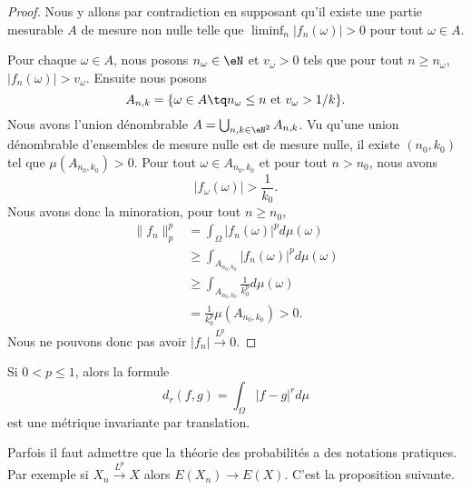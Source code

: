 \begin{proof}
	Nous y allons par contradiction en supposant qu'il existe une partie mesurable \( A\) de mesure non nulle telle que \( \liminf_n| f_n(\omega) |>0\) pour tout \( \omega\in A\).

	Pour chaque \( \omega\in A\), nous posons \( n_{\omega}\in \eN\) et \( v_{\omega}>0\) tels que pour tout \( n\geq n_{\omega}\), \( | f_n(\omega) |>v_{\omega}\). Ensuite nous posons
	\begin{equation}
		A_{n,k}=\{ \omega\in A\tq n_{\omega}\leq n \text{ et } v_{\omega}> 1/k \}.
	\end{equation}
	Nous avons l'union dénombrable \( A=\bigcup_{n,k\in \eN^2}A_{n,k}\). Vu qu'une union dénombrable d'ensembles de mesure nulle est de mesure nulle, il existe \( (n_0,k_0)\) tel que \( \mu(A_{n_0,k_0})>0\). Pour tout \( \omega\in A_{n_0,k_0}\) et pour tout \( n>n_0\), nous avons
	\begin{equation}
		| f_{\omega}(\omega) |>\frac{1}{ k_0}.
	\end{equation}
	Nous avons donc la minoration, pour tout \( n\geq n_0\),
	\begin{subequations}
		\begin{align}
			\| f_n \|_p^p & =\int_{\Omega}| f_n(\omega) |^pd\mu(\omega)         \\       & \geq \int_{A_{n_0,k_0}}| f_n(\omega) |^pd\mu(\omega) \\
			              & \geq \int_{A_{n_0,k_0}}\frac{1}{ k_0^p}d\mu(\omega) \\
			              & =\frac{1}{ k_0^p}\mu(A_{n_0,k_0})>0.
		\end{align}
	\end{subequations}
	Nous ne pouvons donc pas avoir \( | f_n |\stackrel{ L^p}{\longrightarrow} 0\).
\end{proof}

\begin{proposition}	\label{PROPooUMBQooAhUgHA}
	Si \( 0<p\leq 1\), alors la formule
	\begin{equation}
		d_r(f,g)=\int_{\Omega}| f-g |^rd\mu
	\end{equation}
	est une métrique invariante par translation.
\end{proposition}



Parfois il faut admettre que la théorie des probabilités a des notations pratiques. Par exemple si \( X_n\stackrel{ L^p}{\longrightarrow} X\) alors \( E(X_n)\to E(X)\). C'est la proposition suivante.

